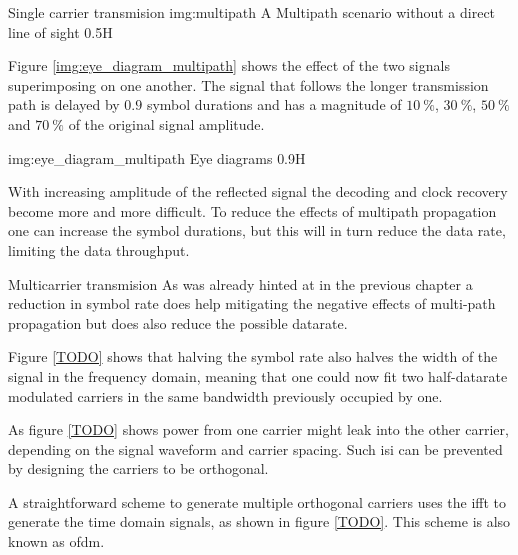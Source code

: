 \begin{subchapter}{Single carrier transmision}
               {img:multipath}
               {A Multipath scenario without a direct line of sight}
               {0.5}{H}

  Figure \ref{img:eye_diagram_multipath} shows the effect of the
  two signals superimposing on one another.
  The signal that follows the longer transmission path
  is delayed by $0.9$ symbol durations and has a magnitude
  of $\SI{10}{\percent}$, $\SI{30}{\percent}$, $\SI{50}{\percent}$ and
  $\SI{70}{\percent}$ of the original signal amplitude.

               {img:eye_diagram_multipath}
               {Eye diagrams}
               {0.9}{H}

  With increasing amplitude of the reflected signal the decoding
  and clock recovery become more and more difficult.
  To reduce the effects of multipath propagation one can
  increase the symbol durations, but this will in turn
  reduce the data rate, limiting the data throughput.
\end{subchapter}

\begin{subchapter}{Multicarrier transmision}
  As was already hinted at in the previous chapter a reduction
  in symbol rate does help mitigating the negative effects of
  multi-path propagation but does also reduce the possible datarate.

  Figure \ref{TODO} shows that halving the symbol rate also
  halves the width of the signal in the frequency domain,
  meaning that one could now fit two half-datarate modulated carriers in the
  same bandwidth previously occupied by one.

  As figure \ref{TODO} shows power from one carrier might leak
  into the other carrier, depending on the signal waveform and
  carrier spacing. Such \gls{isi} can be prevented by designing
  the carriers to be orthogonal.

  A straightforward scheme to generate multiple orthogonal
  carriers uses the \gls{ifft} to generate the time domain
  signals, as shown in figure \ref{TODO}.
  This scheme is also known as \acrlong{ofdm}.

\end{subchapter}

